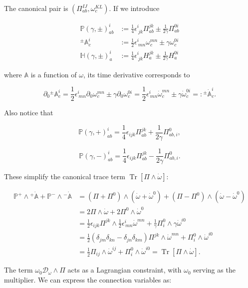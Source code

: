 \documentclass{article}
\begin{document}
The canonical pair is $(\Pi^{IJ}_{ab}, \omega^{KL}_c)$. If we introduce

$$
\begin{aligned}
\mathbb{P}(\gamma, \pm)^i_{ab} &:= \frac{1}{4} \epsilon^i_{\ jk} \Pi^{jk}_{ab} \pm \frac{1}{2\gamma} \Pi^{0i}_{ab} \\
{}^{\pm}\mathbb{A}_c^i &:= \frac{1}{2} \epsilon^i_{\ mn} \omega^{mn}_c \pm \gamma \omega^{0i}_c \\
\mathbb{H}(\gamma, \pm)^i_a &:= \frac{1}{4} \epsilon^i_{\ jk} H^{jk}_a \pm \frac{1}{2\gamma} H^{0i}_a
\end{aligned}
$$

where $\mathbb{A}$ is a function of $\omega$, its time derivative corresponds to

$$
\partial_0 {}^{\pm}\mathbb{A}_c^i = \frac{1}{2} \epsilon^i_{\ mn} \partial_0 \omega^{mn}_c \pm \gamma \partial_0 \omega^{0i}_c = \frac{1}{2} \epsilon^i_{\ mn} \dot{\omega}^{mn}_c \pm \gamma \dot{\omega}^{0i}_c =: {}^{\pm}\dot{\mathbb{A}}_c^i.
$$

Also notice that

$$
\mathbb{P}(\gamma, +)^i_{ab} = \frac{1}{4} \epsilon_{ijk} \Pi^{jk}_{ab} + \frac{1}{2\gamma} \Pi^{0}_{ab, i},
$$

$$
\mathbb{P}(\gamma, -)^i_{ab} = \frac{1}{4} \epsilon_{ijk} \Pi^{jk}_{ab} - \frac{1}{2\gamma} \Pi^{0}_{ab, i}.
$$

These simplify the canonical trace term $\operatorname{Tr}[\Pi\wedge\dot{\omega}]$:

$$
\begin{aligned}
\mathbb{P}^{+} \wedge {}^{+}\dot{\mathbb{A}} + \mathbb{P}^{-} \wedge {}^{-}\dot{\mathbb{A}}
&= (\Pi + \Pi^0) \wedge (\dot{\omega} + \dot{\omega}^0) + (\Pi - \Pi^0) \wedge (\dot{\omega} - \dot{\omega}^0) \\
&= 2 \Pi \wedge \dot{\omega} + 2 \Pi^0 \wedge \dot{\omega}^0 \\
&= \frac{1}{2} \epsilon_{ijk} \Pi^{jk} \wedge \frac{1}{2} \epsilon^i_{\, mn} \dot{\omega}^{mn} + \frac{1}{\gamma} \Pi^{0}_i \wedge \gamma \dot{\omega}^{i0} \\
&= \frac{1}{2} (\delta_{jm}\delta_{kn} - \delta_{jn}\delta_{km}) \Pi^{jk} \wedge \dot{\omega}^{mn} + \Pi^{0}_i \wedge \dot{\omega}^{i0} \\
&= \frac{1}{2} \Pi_{ij} \wedge \dot{\omega}^{ij} + \Pi^0_{i} \wedge \dot{\omega}^{i0} = \operatorname{Tr} [ \Pi \wedge \dot{\omega} ].
\end{aligned}
$$

The term $\omega_0 \mathcal{D}_\omega \wedge \Pi$ acts as a Lagrangian constraint, with $\omega_0$ serving as the multiplier. We can express the connection variables as:
\end{document}
